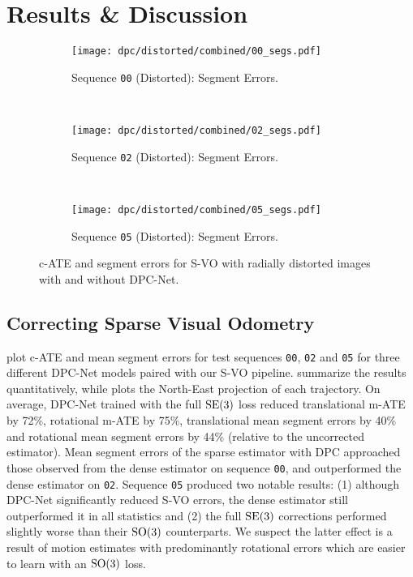 \section{Results \& Discussion}
\begin{figure}
    \centering
    \begin{subfigure}{0.8\textwidth}
        \texttt{[image: dpc/distorted/combined/00\_segs.pdf]}
        \label{00-pose-segs}
        \caption{Sequence \texttt{00} (Distorted): Segment Errors.}
    \end{subfigure} 
    ~
    \begin{subfigure}{0.8\textwidth}
        \texttt{[image: dpc/distorted/combined/02\_segs.pdf]}
        \label{02-pose-segs}
        \caption{Sequence \texttt{02} (Distorted): Segment Errors.}
    \end{subfigure} 
    ~
    \begin{subfigure}{0.8\textwidth}
        \texttt{[image: dpc/distorted/combined/05\_segs.pdf]}
        \label{05-pose-segs}
        \caption{Sequence \texttt{05} (Distorted): Segment Errors.}
    \end{subfigure} 
   \caption{c-ATE and segment errors for S-VO with radially distorted images with and without DPC-Net.}
  \label{fig:cum-seg-errs-distorted} 
\end{figure}

\subsection{Correcting Sparse Visual Odometry}
 plot c-ATE and mean segment errors for test sequences \texttt{00},  \texttt{02} and  \texttt{05} for three different DPC-Net models paired with our S-VO pipeline.  summarize the results quantitatively, while  plots the North-East projection of each trajectory.  On average, DPC-Net trained with the full $\mathrm{SE}(3)$ loss reduced translational m-ATE by 72\%, rotational m-ATE by 75\%, translational mean segment errors by 40\% and rotational mean segment errors by 44\% (relative to the uncorrected estimator). Mean segment errors of the sparse estimator with DPC approached those observed from the dense estimator on sequence \texttt{00}, and outperformed the dense estimator on \texttt{02}. Sequence \texttt{05} produced two notable results: (1) although DPC-Net significantly reduced S-VO errors, the dense estimator still outperformed it in all statistics and (2) the full $\mathrm{SE}(3)$ corrections performed slightly worse than their $\mathrm{SO}(3)$ counterparts. We suspect the latter effect is a result of motion estimates with predominantly rotational errors which are easier to learn with an $\mathrm{SO}(3)$ loss.

